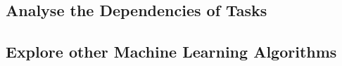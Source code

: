 
        \subsection{Analyse the Dependencies of Tasks}
        \label{sec:analyse-the-dependencies-of-tasks-future-work}


        \subsection{Explore other Machine Learning Algorithms}
        \label{sec:explore-other-machine-learning-algorithms-future-work}


